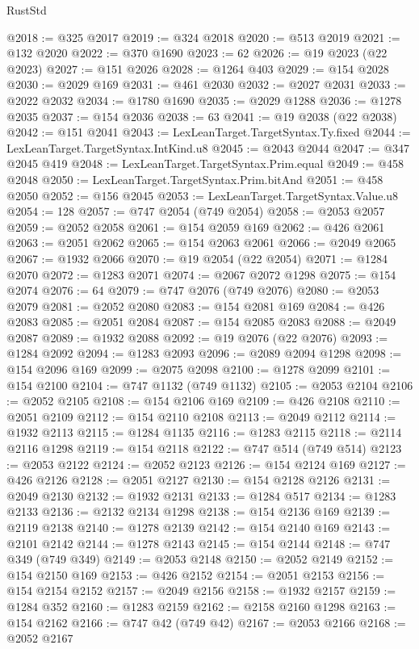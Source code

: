 \begin{lexlean}{RustStd}
\begin{coremodule}
{\begin{coremodule}
{{{{{{{{{{{{{{{{{{{{{{{{{{{{{{{{{{{{{{{{{{{{{{{{{{{{{{{{{{{{{{{{{{{{{{{{{{{{{{{{@2018 := @325 @2017
@2019 := @324 @2018
@2020 := @513 @2019
@2021 := @132 @2020
@2022 := @370 @1690
@2023 := 62
@2026 := @19 @2023 (@22 @2023)
@2027 := @151 @2026
@2028 := @1264 @403
@2029 := @154 @2028
@2030 := @2029 @169
@2031 := @461 @2030
@2032 := @2027 @2031
@2033 := @2022 @2032
@2034 := @1780 @1690
@2035 := @2029 @1288
@2036 := @1278 @2035
@2037 := @154 @2036
@2038 := 63
@2041 := @19 @2038 (@22 @2038)
@2042 := @151 @2041
@2043 := LexLeanTarget.TargetSyntax.Ty.fixed
@2044 := LexLeanTarget.TargetSyntax.IntKind.u8
@2045 := @2043 @2044
@2047 := @347 @2045 @419
@2048 := LexLeanTarget.TargetSyntax.Prim.equal
@2049 := @458 @2048
@2050 := LexLeanTarget.TargetSyntax.Prim.bitAnd
@2051 := @458 @2050
@2052 := @156 @2045
@2053 := LexLeanTarget.TargetSyntax.Value.u8
@2054 := 128
@2057 := @747 @2054 (@749 @2054)
@2058 := @2053 @2057
@2059 := @2052 @2058
@2061 := @154 @2059 @169
@2062 := @426 @2061
@2063 := @2051 @2062
@2065 := @154 @2063 @2061
@2066 := @2049 @2065
@2067 := @1932 @2066
@2070 := @19 @2054 (@22 @2054)
@2071 := @1284 @2070
@2072 := @1283 @2071
@2074 := @2067 @2072 @1298
@2075 := @154 @2074
@2076 := 64
@2079 := @747 @2076 (@749 @2076)
@2080 := @2053 @2079
@2081 := @2052 @2080
@2083 := @154 @2081 @169
@2084 := @426 @2083
@2085 := @2051 @2084
@2087 := @154 @2085 @2083
@2088 := @2049 @2087
@2089 := @1932 @2088
@2092 := @19 @2076 (@22 @2076)
@2093 := @1284 @2092
@2094 := @1283 @2093
@2096 := @2089 @2094 @1298
@2098 := @154 @2096 @169
@2099 := @2075 @2098
@2100 := @1278 @2099
@2101 := @154 @2100
@2104 := @747 @1132 (@749 @1132)
@2105 := @2053 @2104
@2106 := @2052 @2105
@2108 := @154 @2106 @169
@2109 := @426 @2108
@2110 := @2051 @2109
@2112 := @154 @2110 @2108
@2113 := @2049 @2112
@2114 := @1932 @2113
@2115 := @1284 @1135
@2116 := @1283 @2115
@2118 := @2114 @2116 @1298
@2119 := @154 @2118
@2122 := @747 @514 (@749 @514)
@2123 := @2053 @2122
@2124 := @2052 @2123
@2126 := @154 @2124 @169
@2127 := @426 @2126
@2128 := @2051 @2127
@2130 := @154 @2128 @2126
@2131 := @2049 @2130
@2132 := @1932 @2131
@2133 := @1284 @517
@2134 := @1283 @2133
@2136 := @2132 @2134 @1298
@2138 := @154 @2136 @169
@2139 := @2119 @2138
@2140 := @1278 @2139
@2142 := @154 @2140 @169
@2143 := @2101 @2142
@2144 := @1278 @2143
@2145 := @154 @2144
@2148 := @747 @349 (@749 @349)
@2149 := @2053 @2148
@2150 := @2052 @2149
@2152 := @154 @2150 @169
@2153 := @426 @2152
@2154 := @2051 @2153
@2156 := @154 @2154 @2152
@2157 := @2049 @2156
@2158 := @1932 @2157
@2159 := @1284 @352
@2160 := @1283 @2159
@2162 := @2158 @2160 @1298
@2163 := @154 @2162
@2166 := @747 @42 (@749 @42)
@2167 := @2053 @2166
@2168 := @2052 @2167
}}}}}}}}}}}}}}}}}}}}}}}}}}}}}}}}}}}}}}}}}}}}}}}}}}}}}}}}}}}}}}}}}}}}}}}}}}}}}}}}
\end{coremodule}}
\end{coremodule}
\end{lexlean}
